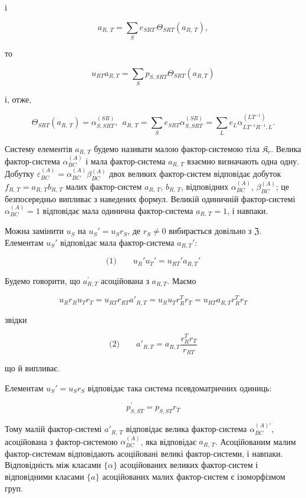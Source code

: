 \documentclass[11pt]{article}
\begin{document}
і

\[a_{R,\,T} = \sum\limits_{S} e_{SRT}\, \Theta_{SRT} \left(a_{R,\,T}\right),\]

то

\[u_{RT} a_{R,T} = \sum\limits_{S} p_{S,SRT} \Theta_{SRT} (a_{R,T})\]

і, отже,

\[\Theta_{SRT}(a_{R,\,T}) = \alpha_{S,SRT}^{(SR)}, ~~ a_{R,\,T} = \sum\limits_{S} e_{SRT} \alpha_{S,SRT}^{(SR)} = \sum\limits_{L} e_{L} \alpha_{LT^{-1}R^{-1},L}^{(LT^{-1})}.\]

Систему елементів \(a_{R,\,T}\) будемо називати малою фактор-системою тіла \(\mathfrak K_r\). Велика фактор-система \(\alpha_{BC}^{(A)}\) і мала фактор-система \(a_{R,\,T}\) взаємно визначають одна одну. Добутку \(\varepsilon_{BC}^{(A)} = \alpha_{BC}^{(A)} \beta_{BC}^{(A)}\) двох великих фактор-систем відповідає добуток \(f_{R,\,T} = a_{R,\,T}b_{R,\,T}\) малих фактор-систем \(a_{R,\,T}\), \(b_{R,\,T}\), відповідних \(\alpha_{BC}^{(A)}\), \(\beta_{BC}^{(A)}\); це безпосередньо випливає з наведених формул. Великій одиничній фактор-системі \(\alpha_{BC}^{(A)} = 1\) відповідає мала одинична фактор-система \(a_{R,\,T} = 1\), і навпаки.

Можна замінити \(u_S\) на \(u_S'=u_Sr_S\), де \(r_S\neq 0\) вибирається довільно з \(\mathfrak Z\). Елементам \(u_S'\) відповідає мала фактор-система \(a_{R,T}'\):

\[
\text{(1)}\qquad u_R'u_T'=u_{RT}'a_{R,T}'
\]

Будемо говорити, що \(a_{R,T}^{\prime}\) асоційована з \(a_{R,T}\). Маємо

\[u_R r_R u_T r_T = u_{RT} r_{RT} a'_{R,T} = u_R u_T r_R^T r_T = u_{RT} a_{R,T} r_R^T r_T\]

звідки

\[
\text{(2)}\qquad a'_{R,T}=a_{R,T}\frac{r_R^T r_T}{r_{RT}}
\]

що й випливає.

Елементам \(u_S' = u_S r_S\) відповідає така система псевдоматричних одиниць:

\[p_{S,ST}^{\prime}=p_{S,ST}r_{T}\]

Тому малій фактор-системі \(a'_{R,\,T}\) відповідає велика фактор-система \(\alpha^{(A)\prime}_{BC}\), асоційована з фактор-системою \(\alpha^{(A)}_{BC}\), яка відповідає \(a_{R,\,T}\). Асоційованим малим фактор-системам відповідають асоційовані великі фактор-системи, і навпаки. Відповідність між класами \(\{\alpha\}\) асоційованих великих фактор-систем і відповідними класами \(\{a\}\) асоційованих малих фактор-систем є ізоморфізмом груп.
\end{document}
